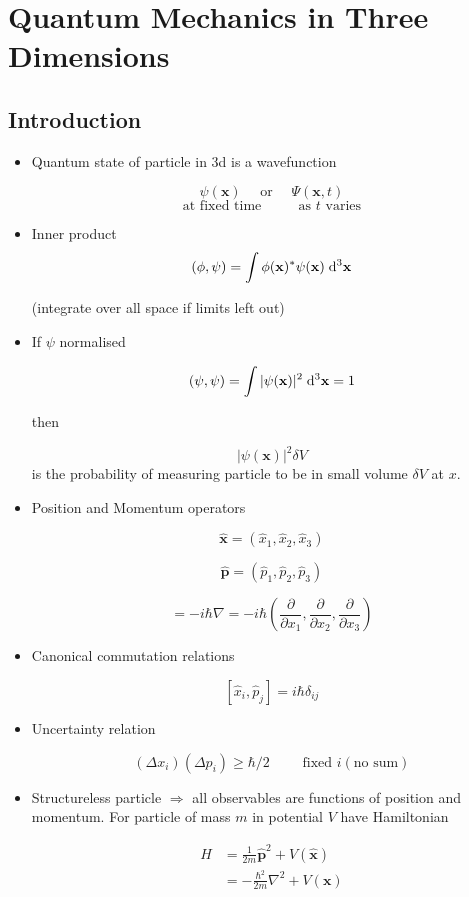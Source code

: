 \documentclass[a4paper]{article}
\begin{document}
\section{Quantum Mechanics in Three Dimensions}

\subsection{Introduction}

\begin{itemize}
	\item Quantum state of particle in 3d is a wavefunction
	
	
	 \[ \psi(\mathbf{x}) \quad \text{ or } \quad \Psi(\mathbf{x},t) \]
	 \[ \text{ at fixed time } \quad \quad \text{ as } t \text{ varies }  \]
	  
	  
	  \item Inner product 
	  \[ (\phi, \psi)  = \int \phi(\mathbf{x})^{*} \psi(\mathbf{x}) \; \mathrm{d}^{3} \mathbf{x} \]
	 
	 (integrate over all space if limits left out)
	 
	 \item If $ \psi $ normalised 
	 
	 \[ (\psi,\psi) = \int | \psi(\mathbf{x}) |^{2} \; \mathrm{d}^{3} \mathbf{x} = 1 \]
	 
	 then
	 
	 \[ | \psi(\mathbf{x}) |^{2} \delta V \] is the probability of measuring particle to be in small volume $ \delta V $ at $ x $.
	 
	 \item Position and Momentum operators
	 
	 \[ \hat{\mathbf{x}} = (\hat{x}_{1},\hat{x}_{2},\hat{x}_{3})  \]
	 
	 \[ \hat{  \mathbf{p} }   = (\hat{p}_{1}, \hat{p}_{2}, \hat{p}_{3}  ) \]
	 
	 \[  = - i \hbar \nabla = - i \hbar \left(  \frac{\partial }{\partial x_{1}}, \frac{\partial }{\partial x_{2}}, \frac{\partial }{\partial x_{3}} \right)  \]
	 
	 \item  Canonical commutation relations 
	                                                   
	 \[  [ \hat{x}_{i},\hat{p}_{j} ] = i \hbar \delta_{ij}  \]
	 
	 \item Uncertainty relation
	 
	 \[ ( \Delta x_{i})(\Delta p_{i}) \geq \hbar / 2  \qquad \text{ fixed } i ( \text{no sum} )\]

	\item Structureless particle $ \Rightarrow $ all observables are functions of position and momentum. For particle of mass $ m $ in potential $ V $ have Hamiltonian 
	
	\begin{align*}
	H & = \frac{1}{2m} \hat{\mathbf{p}}^{2}  + V( \hat{\mathbf{x}})  \\
	& = - \frac{\hbar^{2}}{2m}  \nabla^{2}  + V(\mathbf{x})  
	\end{align*} 	 
	 
\end{itemize}
\end{document}
